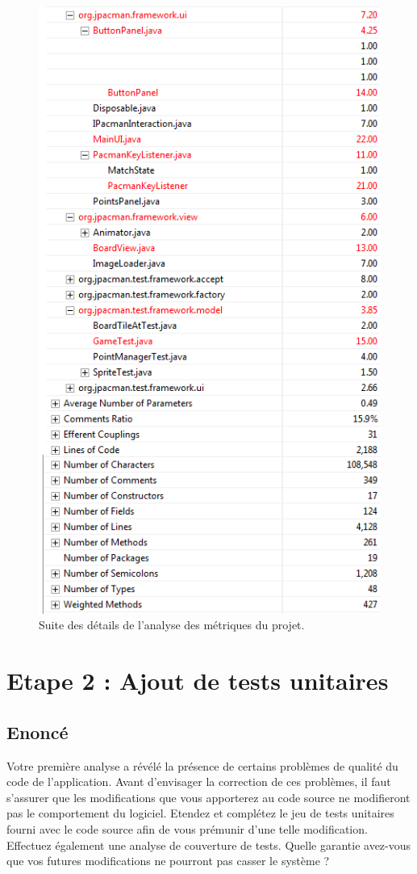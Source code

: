 \documentclass[12pt,a4paper,final]{article}
\begin{document}
\begin{figure}[!h]
	\centering
	\includegraphics[height=\textheight]{Metrique_.png}
	\caption{\label{métrique0}Suite des détails de l'analyse des métriques du projet.}
\end{figure}

\section{Etape 2 : Ajout de tests unitaires}\label{sec:etape2}
\subsection{Enoncé}
Votre première analyse a révélé la présence de certains problèmes de qualité du code de l'application.
Avant d'envisager la correction de ces problèmes, il faut s'assurer que les modifications que vous apporterez au code source ne modifieront pas le comportement du logiciel.
Etendez et complétez le jeu de tests unitaires fourni avec le code source afin de vous prémunir d'une telle modification. Effectuez également une analyse de couverture de tests.
Quelle garantie avez-vous que vos futures modifications ne pourront pas casser le système ?
\end{document}
